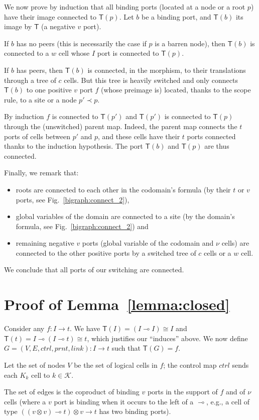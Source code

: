 \documentclass{llncs}
\newcommand{\cat}[1]{\mathbf{#1}}
\newcommand{\fonc}[1]{\mathsf{#1}}
\newcommand{\bsig}{\mathcal{K}} \newcommand{\model}{\mathcal{L}} \newcommand{\bbig}{\cat{Bbg}} \newcommand{\T}{\fonc{T}} \newcommand{\theory}{\mathcal{T}}
\newcommand{\prnt}{\mathit{prnt}}
\newcommand{\link}{\mathit{link}}
\newcommand{\ctrl}{\mathit{ctrl}}
\newcommand{\iso}{\cong}
\newcommand{\impll}{\multimap}
\newcommand{\tens}{\otimes}
\begin{document}
We now prove by induction that all binding ports (located at a
node or a root $p$) have their image connected to $\T(p)$.  Let
$b$ be a binding port, and $\T(b)$ its image by $\T$ (a
negative $v$ port).

If $b$ has no peers (this is necessarily the case if $p$ is a
barren node), then $\T(b)$ is connected to a $w$ cell whose $I$
port is connected to $\T(p)$.

If $b$ has peers, then $\T(b)$ is connected, in the morphism, to
their translations through a tree of $c$ cells.  But this tree is
heavily switched and only connects $\T(b)$ to one
positive $v$ port $f$ (whose preimage is) located, thanks to the
scope rule, to a site or a node $p' \prec p$.

By induction $f$ is connected to $\T(p')$ and $\T(p')$ is connected to
$\T(p)$ through the (unswitched) parent map. 
Indeed, the parent map connects the $t$ ports of cells between $p'$ and
$p$, and these cells have their $t$ ports connected thanks to the induction
hypothesis.
The port $\T(b)$ and $\T(p)$ are thus connected. 

Finally, we remark that:
\begin{itemize}
\item roots are connected to each other in the codomain's formula (by their $t$
  or $v$ ports, see Fig.~\ref{bigraph:connect_2}), 
\item global variables of the domain are connected to a site (by the domain's formula, see Fig.~\ref{bigraph:connect_2}) and
\item remaining negative $v$ ports (global variable
  of the codomain and $\nu$ cells) are connected to the other
  positive ports by a switched tree of $c$ cells or a
  $w$ cell.
\end{itemize}
We conclude that all ports of our switching are connected.

\section{Proof of Lemma~\ref{lemma:closed}}
  Consider any $f: I \to t$.  We have $\T(I) = (I \impll I) \iso I$
  and $\T(t) = I \impll (I \impll t) \iso t$, which justifies our
  ``induces'' above.  We now define $G = (V,E,\ctrl,\prnt,\link): I
  \to t$ such that $\T (G) = f$.

  Let the set of nodes $V$ be the set of logical cells in $f$; the
  control map $\ctrl$ sends each $K_k$ cell to $k \in \bsig$.  
  
  The set of edges is the coproduct of binding $v$ ports in the
  support of $f$ and of $\nu$ cells (where a $v$ port is binding when
  it occurs to the left of a $\impll$, e.g., a cell of type $((v \tens
  v) \impll t) \tens v \to t$ has two binding ports).
\end{document}
